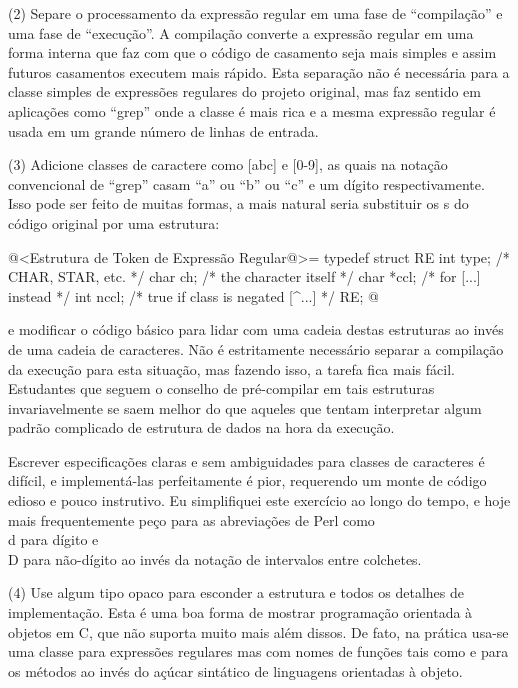 (2) Separe o processamento da expressão regular em uma fase de
``compilação'' e uma fase de ``execução''. A compilação converte a
expressão regular em uma forma interna que faz com que o código de
casamento seja mais simples e assim futuros casamentos executem mais
rápido. Esta separação não é necessária para a classe simples de
expressões regulares do projeto original, mas faz sentido em
aplicações como ``grep'' onde a classe é mais rica e a mesma expressão
regular é usada em um grande número de linhas de entrada.

(3) Adicione classes de caractere como [abc] e [0-9], as quais na
notação convencional de ``grep'' casam ``a'' ou ``b'' ou ``c'' e um
dígito respectivamente. Isso pode ser feito de muitas formas, a mais
natural seria substituir os s do código original
por uma estrutura:

@<Estrutura de Token de Expressão Regular@>=
typedef struct RE {
  int     type;   /* CHAR, STAR, etc. */
  char    ch;     /* the character itself */
  char    *ccl;   /* for [...] instead */
  int     nccl;   /* true if class is negated [^...] */
} RE;
@

e modificar o código básico para lidar com uma cadeia destas
estruturas ao invés de uma cadeia de caracteres. Não é estritamente
necessário separar a compilação da execução para esta situação, mas
fazendo isso, a tarefa fica mais fácil. Estudantes que seguem o
conselho de pré-compilar em tais estruturas invariavelmente se saem
melhor do que aqueles que tentam interpretar algum padrão complicado
de estrutura de dados na hora da execução.

Escrever especificações claras e sem ambiguidades para classes de
caracteres é difícil, e implementá-las perfeitamente é pior,
requerendo um monte de código edioso e pouco instrutivo. Eu
simplifiquei este exercício ao longo do tempo, e hoje mais
frequentemente peço para as abreviações de Perl como \\\/d para dígito
e \\\/D para não-dígito ao invés da notação de intervalos entre
colchetes.

(4) Use algum tipo opaco para esconder a estrutura  e
todos os detalhes de implementação. Esta é uma boa forma de mostrar
programação orientada à objetos em C, que não suporta muito mais além
dissos. De fato, na prática usa-se uma classe para expressões
regulares mas com nomes de funções tais como  e
 para os métodos ao invés do açúcar sintático
de linguagens orientadas à objeto.

